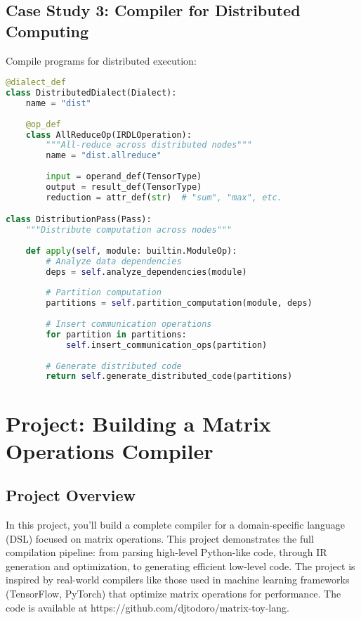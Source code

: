 \documentclass[11pt,a4paper]{article}
\begin{document}
\subsection{Case Study 3: Compiler for Distributed Computing}

Compile programs for distributed execution:

\begin{lstlisting}[language=Python, caption=Distributed Computing Compiler]
@dialect_def
class DistributedDialect(Dialect):
    name = "dist"
    
    @op_def
    class AllReduceOp(IRDLOperation):
        """All-reduce across distributed nodes"""
        name = "dist.allreduce"
        
        input = operand_def(TensorType)
        output = result_def(TensorType)
        reduction = attr_def(str)  # "sum", "max", etc.

class DistributionPass(Pass):
    """Distribute computation across nodes"""
    
    def apply(self, module: builtin.ModuleOp):
        # Analyze data dependencies
        deps = self.analyze_dependencies(module)
        
        # Partition computation
        partitions = self.partition_computation(module, deps)
        
        # Insert communication operations
        for partition in partitions:
            self.insert_communication_ops(partition)
        
        # Generate distributed code
        return self.generate_distributed_code(partitions)
\end{lstlisting}

\section{Project: Building a Matrix Operations Compiler}

\subsection{Project Overview}

In this project, you'll build a complete compiler for a domain-specific language (DSL) focused on matrix operations. This project demonstrates the full compilation pipeline: from parsing high-level Python-like code, through IR generation and optimization, to generating efficient low-level code. The project is inspired by real-world compilers like those used in machine learning frameworks (TensorFlow, PyTorch) that optimize matrix operations for performance. The code is available at https://github.com/djtodoro/matrix-toy-lang.
\end{document}
